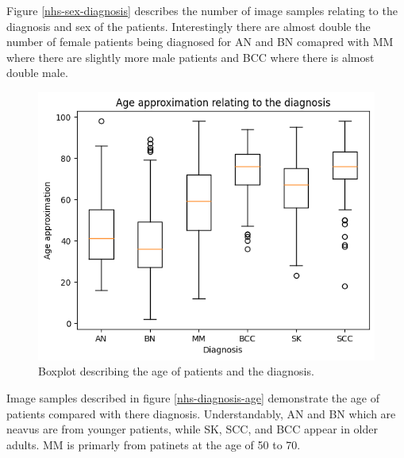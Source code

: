 Figure \ref{nhs-sex-diagnosis} describes the number of image samples relating to the diagnosis and sex of the patients. Interestingly there are almost double the number of female patients being diagnosed for AN and BN comapred with MM where there are slightly more male patients and BCC where there is almost double male.

\begin{figure}
	\centering
	\includegraphics[scale=0.8]{images/nhs/nhs-diagnosis-age.png}
	\caption{Boxplot describing the age of patients and the diagnosis.} 
\end{figure} \label{nhs-diagnosis-age}

Image samples described in figure \ref{nhs-diagnosis-age} demonstrate the age of patients compared with there diagnosis. Understandably, AN and BN which are neavus are from younger patients, while SK, SCC, and BCC appear in older adults. MM is primarly from patinets at the age of 50 to 70.

